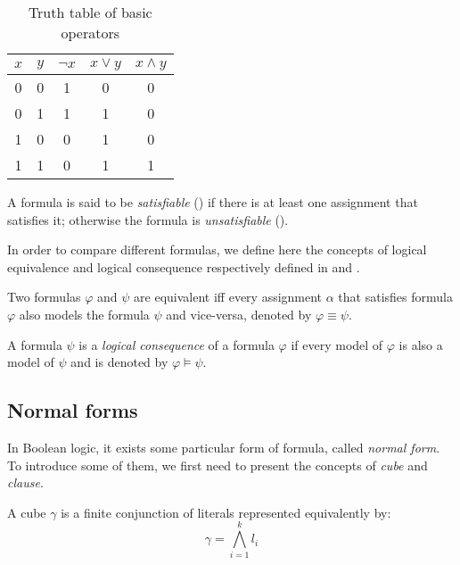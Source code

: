 \begin{table}[!htbp]
 \centering
 \begin{tabular}{cc|ccc}
  $x$ & $y$ & $\neg x$ & $x \lor y$ & $x \land y$ \\
  \toprule
  0 & 0 & 1 & 0 & 0 \\
  \midrule
  0 & 1 & 1 & 1 & 0 \\
  \midrule
  1 & 0 & 0 & 1 & 0 \\
  \midrule
  1 & 1 & 0 & 1 & 1 \\
  \bottomrule
 \end{tabular}
 \caption{Truth table of basic operators}
 \label{tab:truthtable}
\end{table}


A formula is said to be
\emph{satisfiable} (\sat) if there is at least one assignment that satisfies it;
otherwise the formula is \emph{unsatisfiable} (\unsat).

In order to compare different formulas, we define here the concepts of logical equivalence and logical consequence
respectively defined in  and .

\begin{definition}\label{def:equiv}
	Two formulas $\varphi$ and $\psi$ are equivalent iff every assignment $\alpha$ that satisfies 
	formula $\varphi$  also models the formula $\psi$ and vice-versa, denoted by $\varphi \equiv \psi$.
\end{definition}

\begin{definition}\label{def:logcons}
	A formula $\psi$ is a \emph{logical consequence} of a formula $\varphi$ if every model of $\varphi$
	is also a model of $\psi$ and is denoted by $\varphi \models \psi$.
\end{definition}


\subsection{Normal forms}
In Boolean logic, it exists some particular form of formula, called \emph{normal form}.
To introduce some of them, we first need to present the concepts of \emph{cube} and \emph{clause}.

\begin{definition}[Cube]
A cube $\gamma$ is a finite conjunction of literals represented equivalently by:
$$\gamma = \bigwedge_{i=1}^k l_i $$
\end{definition}


